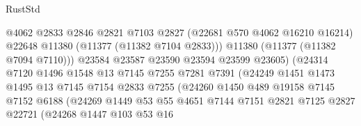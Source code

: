 \begin{lexlean}{RustStd}
\begin{coremodule}
                                      @4062
                                      @2833
                                      @2846
                                      @2821
                                      @7103
                                      @2827
                                      (@22681 @570 @4062 @16210 @16214)
                                      @22648
                                      @11380
                                      (@11377 (@11382 @7104 @2833)))
                                    @11380
                                    (@11377 (@11382 @7094 @7110)))
                                  @23584
                                  @23587
                                  @23590
                                  @23594
                                  @23599
                                  @23605)
                                (@24314
                                  @7120
                                  @1496
                                  @1548
                                  @13
                                  @7145
                                  @7255
                                  @7281
                                  @7391
                                  (@24249
                                    @1451
                                    @1473
                                    @1495
                                    @13
                                    @7145
                                    @7154
                                    @2833
                                    @7255
                                    (@24260
                                      @1450
                                      @489
                                      @19158
                                      @7145
                                      @7152
                                      @6188
                                      (@24269
                                        @1449
                                        @53
                                        @55
                                        @4651
                                        @7144
                                        @7151
                                        @2821
                                        @7125
                                        @2827
                                        @22721
                                        (@24268
                                          @1447
                                          @103
                                          @53
                                          @16

\end{coremodule}
\end{lexlean}
